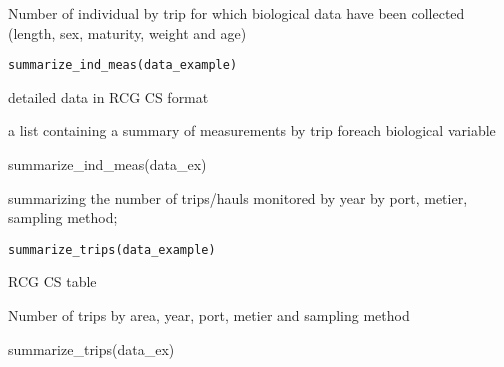 \documentclass[a4paper]{book}
\begin{document}
%
\begin{Description}\relax
Number of individual by trip for which biological data have been collected (length, sex, maturity, weight and age)
\end{Description}
%
\begin{Usage}
\begin{verbatim}
summarize_ind_meas(data_example)
\end{verbatim}
\end{Usage}
%
\begin{Arguments}
\begin{ldescription}
\item[\code{data\_example}] detailed data in RCG CS format
\end{ldescription}
\end{Arguments}
%
\begin{Value}
a list containing a summary of measurements by trip foreach biological variable
\end{Value}
%
\begin{Examples}
\begin{ExampleCode}
summarize_ind_meas(data_ex)
\end{ExampleCode}
\end{Examples}
%
\begin{Description}\relax
summarizing the number of trips/hauls monitored by year by port, metier, sampling method;
\end{Description}
%
\begin{Usage}
\begin{verbatim}
summarize_trips(data_example)
\end{verbatim}
\end{Usage}
%
\begin{Arguments}
\begin{ldescription}
\item[\code{data\_example}] RCG CS table
\end{ldescription}
\end{Arguments}
%
\begin{Value}
Number of trips by area, year, port, metier and sampling method
\end{Value}
%
\begin{Examples}
\begin{ExampleCode}
summarize_trips(data_ex)
\end{ExampleCode}
\end{Examples}
\end{document}
